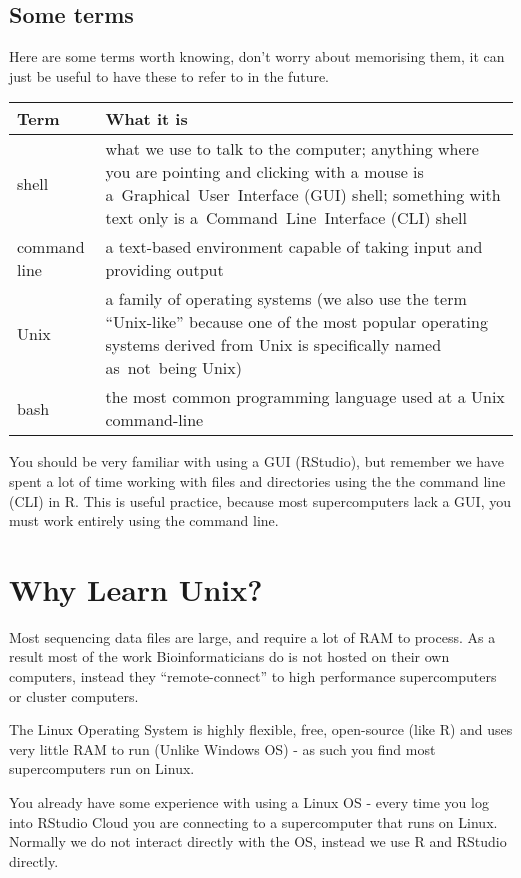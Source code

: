 \documentclass[
]{book}
\begin{document}
\hypertarget{some-terms}{%
\subsection{Some terms}\label{some-terms}}

Here are some terms worth knowing, don't worry about memorising them, it can just be useful to have these to refer to in the future.

\begin{longtable}{ll}
\toprule
\textbf{Term} & \textbf{What it is}\\
\midrule
shell & what we use to talk to the computer; anything where you are pointing and clicking with a mouse is a Graphical User Interface (GUI) shell; something with text only is a Command Line Interface (CLI) shell\\
command line & a text-based environment capable of taking input and providing output\\
Unix & a family of operating systems (we also use the term “Unix-like” because one of the most popular operating systems derived from Unix is specifically named as not being Unix)\\
bash & the most common programming language used at a Unix command-line\\
\bottomrule
\end{longtable}

You should be very familiar with using a GUI (RStudio), but remember we have spent a lot of time working with files and directories using the the command line (CLI) in R. This is useful practice, because most supercomputers lack a GUI, you must work entirely using the command line.

\hypertarget{why-learn-unix}{%
\section{Why Learn Unix?}\label{why-learn-unix}}

Most sequencing data files are large, and require a lot of RAM to process. As a result most of the work Bioinformaticians do is not hosted on their own computers, instead they ``remote-connect'' to high performance supercomputers or cluster computers.

The Linux Operating System is highly flexible, free, open-source (like R) and uses very little RAM to run (Unlike Windows OS) - as such you find most supercomputers run on Linux.

You already have some experience with using a Linux OS - every time you log into RStudio Cloud you are connecting to a supercomputer that runs on Linux. Normally we do not interact directly with the OS, instead we use R and RStudio directly.
\end{document}
